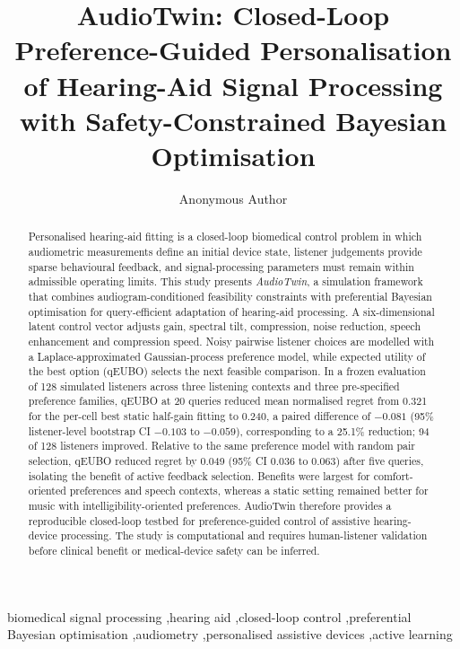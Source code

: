 \documentclass[preprint,12pt]{elsarticle}
\begin{document}
\begin{frontmatter}

\title{AudioTwin: Closed-Loop Preference-Guided Personalisation of Hearing-Aid Signal Processing with Safety-Constrained Bayesian Optimisation}

\author[anon]{Anonymous Author}
\address[anon]{Anonymous Institution}

\begin{abstract}
Personalised hearing-aid fitting is a closed-loop biomedical control problem in which audiometric measurements define an initial device state, listener judgements provide sparse behavioural feedback, and signal-processing parameters must remain within admissible operating limits. This study presents \textit{AudioTwin}, a simulation framework that combines audiogram-conditioned feasibility constraints with preferential Bayesian optimisation for query-efficient adaptation of hearing-aid processing. A six-dimensional latent control vector adjusts gain, spectral tilt, compression, noise reduction, speech enhancement and compression speed. Noisy pairwise listener choices are modelled with a Laplace-approximated Gaussian-process preference model, while expected utility of the best option (qEUBO) selects the next feasible comparison. In a frozen evaluation of 128 simulated listeners across three listening contexts and three pre-specified preference families, qEUBO at 20 queries reduced mean normalised regret from 0.321 for the per-cell best static half-gain fitting to 0.240, a paired difference of $-0.081$ (95\% listener-level bootstrap CI $-0.103$ to $-0.059$), corresponding to a 25.1\% reduction; 94 of 128 listeners improved. Relative to the same preference model with random pair selection, qEUBO reduced regret by 0.049 (95\% CI 0.036 to 0.063) after five queries, isolating the benefit of active feedback selection. Benefits were largest for comfort-oriented preferences and speech contexts, whereas a static setting remained better for music with intelligibility-oriented preferences. AudioTwin therefore provides a reproducible closed-loop testbed for preference-guided control of assistive hearing-device processing. The study is computational and requires human-listener validation before clinical benefit or medical-device safety can be inferred.
\end{abstract}

\begin{keyword}
biomedical signal processing \sep hearing aid \sep closed-loop control \sep preferential Bayesian optimisation \sep audiometry \sep personalised assistive devices \sep active learning
\end{keyword}

\end{frontmatter}
\end{document}

